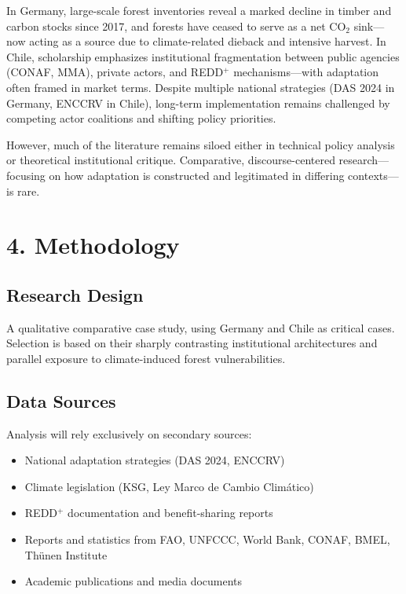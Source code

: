 In Germany, large-scale forest inventories reveal a marked decline in timber and carbon stocks since 2017, and forests have ceased to serve as a net CO$_2$ sink---now acting as a source due to climate-related dieback and intensive harvest. In Chile, scholarship emphasizes institutional fragmentation between public agencies (CONAF, MMA), private actors, and REDD$^+$ mechanisms---with adaptation often framed in market terms. Despite multiple national strategies (DAS 2024 in Germany, ENCCRV in Chile), long-term implementation remains challenged by competing actor coalitions and shifting policy priorities.

However, much of the literature remains siloed either in technical policy analysis or theoretical institutional critique. Comparative, discourse-centered research---focusing on how adaptation is constructed and legitimated in differing contexts---is rare.

\section*{4. Methodology}

\subsection*{Research Design}
A qualitative comparative case study, using Germany and Chile as critical cases. Selection is based on their sharply contrasting institutional architectures and parallel exposure to climate-induced forest vulnerabilities.

\subsection*{Data Sources}
Analysis will rely exclusively on secondary sources:

\begin{itemize}
  \item National adaptation strategies (DAS 2024, ENCCRV)
  \item Climate legislation (KSG, Ley Marco de Cambio Climático)
  \item REDD$^+$ documentation and benefit-sharing reports
  \item Reports and statistics from FAO, UNFCCC, World Bank, CONAF, BMEL, Thünen Institute
  \item Academic publications and media documents
\end{itemize}


